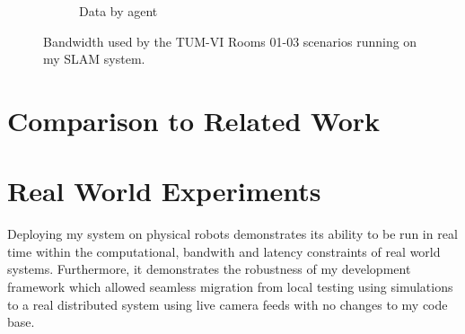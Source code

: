 \begin{figure}[h]
\begin{subfigure}[b]{0.45\linewidth}
        \caption{Data by agent}
    \end{subfigure}%

    \caption{Bandwidth used by the TUM-VI Rooms 01-03 scenarios running on my SLAM system.}
    \label{fig:euroc-mh-01-02-bandwith}
\end{figure}


\section{Comparison to Related Work}
\label{sec:comparison-to-related-work}





\section{Real World Experiments}
\label{sec:real-world-experiments}
Deploying my system on physical robots demonstrates its ability to be run in real time within the computational, bandwith and latency constraints of real world systems. Furthermore, it demonstrates the robustness of my development framework which allowed seamless migration from local testing using simulations to a real distributed system using live camera feeds with no changes to my code base.

